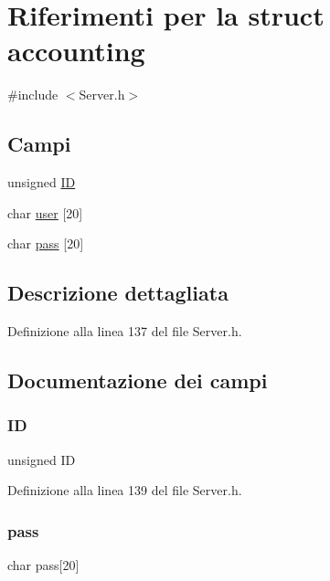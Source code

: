 \hypertarget{a00072}{}\section{Riferimenti per la struct accounting}
\label{a00072}


{\ttfamily \#include $<$Server.\+h$>$}

\subsection*{Campi}
\begin{DoxyCompactItemize}
\item 
unsigned \mbox{\hyperlink{a00072_ac6aae43c72cdc2c322ef01d6621a805b}{ID}}
\item 
char \mbox{\hyperlink{a00072_a5d3c37c25271af8d09ce76fb32508f26}{user}} \mbox{[}20\mbox{]}
\item 
char \mbox{\hyperlink{a00072_a66d8e7eb200051aa1aac4a0456cc9e62}{pass}} \mbox{[}20\mbox{]}
\end{DoxyCompactItemize}


\subsection{Descrizione dettagliata}


Definizione alla linea 137 del file Server.\+h.



\subsection{Documentazione dei campi}
\mbox{\label{a00072_ac6aae43c72cdc2c322ef01d6621a805b}} 
\subsubsection{\texorpdfstring{ID}{ID}}
{\footnotesize\ttfamily unsigned ID}



Definizione alla linea 139 del file Server.\+h.

\mbox{\label{a00072_a66d8e7eb200051aa1aac4a0456cc9e62}} 
\subsubsection{\texorpdfstring{pass}{pass}}
{\footnotesize\ttfamily char pass\mbox{[}20\mbox{]}}



